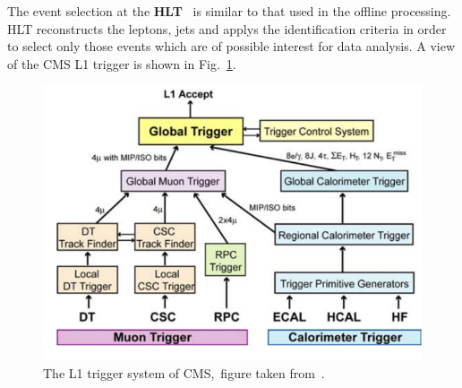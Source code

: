 The event selection at the \textbf{HLT}~\cite{Cittolin:578006} is similar to that used in the offline processing. HLT reconstructs the leptons, jets and applys the identification criteria in order to select only those events which are of possible interest for data analysis. A view of the CMS L1 trigger is shown in Fig.~\ref{cms-trigger}.

\begin{figure}[H]
\centering
\includegraphics[scale=0.5]{chapter2/cms-trigger.png}
\caption{The L1 trigger system of CMS,~figure taken from~\cite{Collaboration_2008cms}.}
\label{cms-trigger}
\end{figure} 



